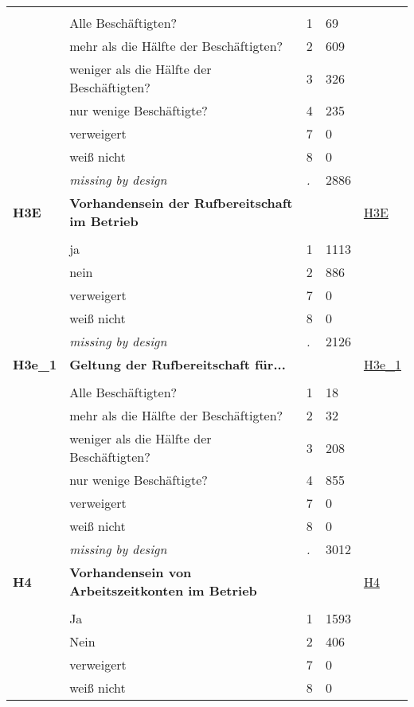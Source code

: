 \begin{longtable}{| L{2.65cm} | L{8cm} | C{1.5cm} | R{1.25cm} | C{2.25cm}  |}
   &  &  &  &  \\ 
   & Alle Beschäftigten? & 1 & 69 &  \\ 
   & mehr als die Hälfte der Beschäftigten? & 2 & 609 &  \\ 
   & weniger als die Hälfte der Beschäftigten? & 3 & 326 &  \\ 
   & nur wenige Beschäftigte? & 4 & 235 &  \\ 
   & verweigert & 7 & 0 &  \\ 
   & weiß nicht & 8 & 0 &  \\ 
   & \textit{missing by design} & \textit{.} & 2886 &  \\ 
   \midrule
\textbf{H3E}\label{var:H3E} & \textbf{Vorhandensein der Rufbereitschaft im Betrieb} &  &  & \hyperref[H3E]{H3E} \\ 
   &  &  &  &  \\ 
   & ja & 1 & 1113 &  \\ 
   & nein & 2 & 886 &  \\ 
   & verweigert & 7 & 0 &  \\ 
   & weiß nicht & 8 & 0 &  \\ 
   & \textit{missing by design} & \textit{.} & 2126 &  \\ 
   \midrule
\textbf{H3e\_1}\label{var:H3e:1} & \textbf{Geltung der Rufbereitschaft für...} &  &  & \hyperref[H3e:1]{H3e\_1} \\ 
   &  &  &  &  \\ 
   & Alle Beschäftigten? & 1 & 18 &  \\ 
   & mehr als die Hälfte der Beschäftigten? & 2 & 32 &  \\ 
   & weniger als die Hälfte der Beschäftigten? & 3 & 208 &  \\ 
   & nur wenige Beschäftigte? & 4 & 855 &  \\ 
   & verweigert & 7 & 0 &  \\ 
   & weiß nicht & 8 & 0 &  \\ 
   & \textit{missing by design} & \textit{.} & 3012 &  \\ 
   \midrule
\textbf{H4}\label{var:H4} & \textbf{Vorhandensein von Arbeitszeitkonten im Betrieb} &  &  & \hyperref[H4]{H4} \\ 
   &  &  &  &  \\ 
   & Ja & 1 & 1593 &  \\ 
   & Nein & 2 & 406 &  \\ 
   & verweigert & 7 & 0 &  \\ 
   & weiß nicht & 8 & 0 &  \\ 

\end{longtable}
